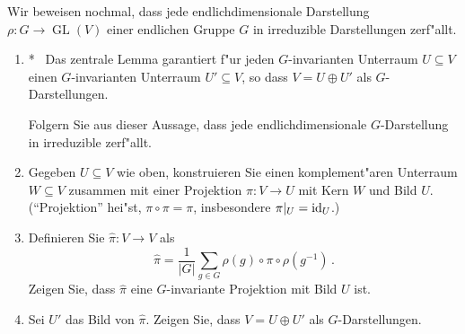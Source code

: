 \documentclass[a4,11pt]{article}
\newcommand{\bonusitem}{\item\hspace*{-2.4mm}*\ }
\begin{document}
\vspace*{-17mm}
{
\kopf
}



\begin{aufgabe}[4 Punkte]
  Wir beweisen nochmal, dass jede endlichdimensionale Darstellung
  $\rho \colon G \to \operatorname{GL}(V)$ einer endlichen Gruppe $G$ in irreduzible
  Darstellungen zerf"allt.
\begin{enumerate}
\addtocounter{enumi}{-1}
\bonusitem
Das zentrale Lemma garantiert f"ur jeden $G$-invarianten Unterraum $U
\subseteq V$ einen $G$-invarianten Unterraum $U' \subseteq V$, so dass
$V = U \oplus U'$ als $G$-Darstellungen.

Folgern Sie aus dieser Aussage, dass jede endlichdimensionale
$G$-Darstellung in irreduzible zerf"allt.
\item Gegeben $U \subseteq V$ wie oben, konstruieren Sie einen
  komplement"aren Unterraum $W \subseteq V$ zusammen mit einer
  Projektion $\pi \colon V \to U$ mit Kern $W$ und Bild
  $U$. ("`Projektion"' hei"st, $\pi \circ \pi = \pi$, insbesondere
  $\pi|_U = {\rm id}_U$.)
\item Definieren Sie $\hat \pi \colon V \to V$ als
  $$
  \hat \pi = \frac{1}{|G|} \sum_{g \in G} \rho(g) \circ \pi \circ \rho(g^{-1}) \,.
  $$
  Zeigen Sie, dass $\hat \pi$ eine $G$-invariante Projektion mit Bild $U$ ist.
\item Sei $U'$ das Bild von $\hat \pi$. Zeigen Sie, dass $V = U \oplus
  U'$ als $G$-Darstellungen.
  \end{enumerate}
\end{aufgabe}
\end{document}
